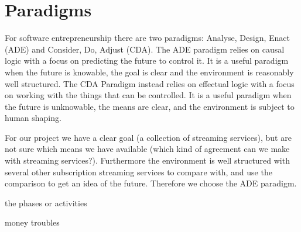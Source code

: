 \section{Paradigms}
\label{sec:paradigms}
For software entrepreneurship there are two paradigms: Analyse, Design, Enact (ADE) and Consider, Do, Adjust (CDA).
The ADE paradigm relies on causal logic with a focus on predicting the future to control it.
It is a useful paradigm when the future is knowable, the goal is clear and the environment is reasonably well structured.
The CDA Paradigm instead relies on effectual logic with a focus on working with the things that can be controlled.
It is a useful paradigm when the future is unknowable, the means are clear, and the environment is subject to human shaping.

For our project we have a clear goal (a collection of streaming services), but are not sure which means we have available (which kind of agreement can we make with streaming services?).
Furthermore the environment is well structured with several other subscription streaming services to compare with, and use the comparison to get an idea of the future.
Therefore we choose the ADE paradigm.

the phases or activities

money troubles